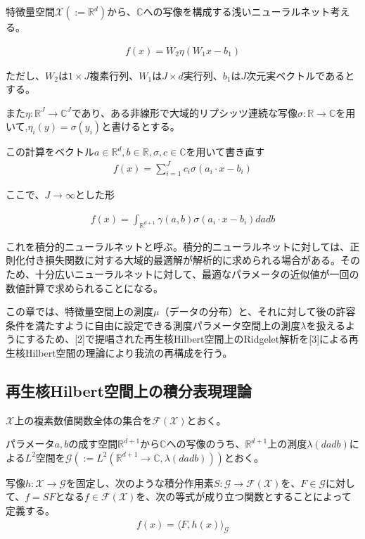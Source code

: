 \documentclass{jsarticle}
\begin{document}
特徴量空間$\mathcal{X}(:=\mathbb{R}^d)$から、$\mathbb{C}$への写像を構成する浅いニューラルネット考える。

\begin{align}
f(x)=W_2\eta(W_1x-b_1)
\end{align}


ただし、$W_2$は$1\times J$複素行列、$W_1$は$J\times d$実行列、$b_1$は$J$次元実ベクトルであるとする。

また$\eta:\mathbb{R}^J\to\mathbb{C}^J$であり、ある非線形で大域的リプシッツ連続な写像$\sigma:\mathbb{R}\to\mathbb{C}$を用いて,$\eta_i(y)=\sigma(y_i)$と書けるとする。


この計算をベクトル$a\in\mathbb{R}^d,b\in\mathbb{R},\sigma,c\in\mathbb{C}$を用いて書き直す
\begin{align}
f(x)=\sum^J_{i=1}c_i\sigma(a_i\cdot x-b_i)
\end{align}

ここで、$J\to\infty$とした形

\begin{align}
f(x)=\int_{\mathbb{R}^{d+1}}\gamma(a,b)\sigma(a_i\cdot x-b_i)dadb
\end{align}

これを積分的ニューラルネットと呼ぶ。積分的ニューラルネットに対しては、正則化付き損失関数に対する大域的最適解が解析的に求められる場合がある。そのため、十分広いニューラルネットに対して、最適なパラメータの近似値が一回の数値計算で求められることになる。



この章では、特徴量空間上の測度$\mu$（データの分布）と、それに対して後の許容条件を満たすように自由に設定できる測度パラメータ空間上の測度$\lambda$を扱えるようにするため、[2]で提唱された再生核Hilbert空間上のRidgelet解析を[3]による再生核Hilbert空間の理論により我流の再構成を行う。

\subsection{再生核Hilbert空間上の積分表現理論}

$\mathcal{X}$上の複素数値関数全体の集合を$\mathcal{F}(\mathcal{X})$とおく。

パラメータ$a,b$の成す空間$\mathbb{R}^{d+1}$から$\mathbb{C}$への写像のうち、$\mathbb{R}^{d+1}$上の測度$\lambda(dadb)$による$L^2$空間を$\mathcal{G}(:=L^2(\mathbb{R}^{d+1}\to\mathbb{C},\lambda(dadb)))$とおく。

写像$h:\mathcal{X}\to\mathcal{G}$を固定し、次のような積分作用素$S:\mathcal{G}\to\mathcal{F}(\mathcal{X})$を、$F\in\mathcal{G}$に対して、$f=SF$となる$f\in\mathcal{F}(\mathcal{X})$を、次の等式が成り立つ関数とすることによって定義する。
\begin{align}
f(x)=\langle F,h(x)\rangle_\mathcal{G}
\end{align}
\end{document}
